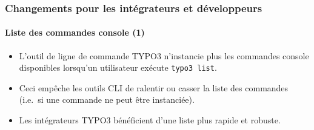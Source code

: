 %

\begin{frame}[fragile]
	\frametitle{Changements pour les intégrateurs et développeurs}
	\framesubtitle{Liste des commandes console (1)}

	\begin{itemize}
		\item L'outil de ligne de commande TYPO3 n'instancie plus les commandes
			console disponibles lorsqu'un utilisateur exécute \texttt{typo3 list}.
		\item Ceci empêche les outils CLI de ralentir ou casser la liste
			des commandes (i.e.\ si une commande ne peut être instanciée).
		\item Les intégrateurs TYPO3 bénéficient d'une liste plus rapide et robuste.
	\end{itemize}

\end{frame}

